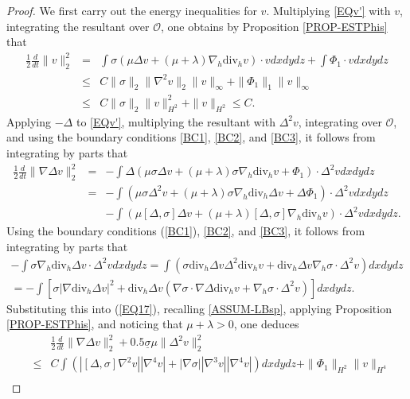 \documentclass[12pt,reqno]{amsart}
\numberwithin{equation}{section}
\begin{document}
\begin{proof}
We first carry out the energy inequalities for $v$. Multiplying \eqref{EQv'} with $v$, integrating the resultant over $\mathcal O$, one obtains by Proposition \ref{PROP-ESTPhis} that
\begin{eqnarray}
  \frac12\frac{d}{dt}\|v\|_2^2&=&\int\sigma(\mu\Delta v+(\mu+\lambda)\nabla_h\text{div}_hv)\cdot vdxdydz+\int\Phi_1\cdot vdxdydz \nonumber\\
  &\leq& C\|\sigma\|_2\|\nabla^2v\|_2\|v\|_\infty+\|\Phi_1\|_1\|v\|_\infty\nonumber\\
  &\leq& C\|\sigma\|_{2}\|v\|_{H^2}^2+\|v\|_{H^2}\leq C.\label{EQ16}
\end{eqnarray}
Applying $-\Delta$ to \eqref{EQv'}, multiplying the resultant with $\Delta^2v$, integrating over $\mathcal O$, and using the boundary
conditions \eqref{BC1}, \eqref{BC2}, and \eqref{BC3}, it follows from integrating by parts that
\begin{eqnarray}
  \frac12\frac{d}{dt}\|\nabla\Delta v\|_2^2
  &=&-\int\Delta(\mu\sigma\Delta v+(\mu+\lambda)\sigma\nabla_h\text{div}_hv+\Phi_1)\cdot\Delta^2vdxdydz\nonumber\\
  &=&-\int(\mu\sigma\Delta^2v+(\mu+\lambda)\sigma\nabla_h\text{div}_h\Delta v+\Delta\Phi_1)\cdot\Delta^2vdxdydz\nonumber\\
  &&-\int(\mu[\Delta,\sigma]\Delta v+(\mu+\lambda)[\Delta,\sigma]\nabla_h\text{div}_hv)\cdot\Delta^2v dxdydz. \label{EQ17}
\end{eqnarray}
Using the boundary conditions (\ref{BC1}), \eqref{BC2}, and \eqref{BC3}, it follows from integrating by parts that
\begin{eqnarray*}
  -\int\sigma\nabla_h\text{div}_h\Delta v\cdot\Delta^2vdxdydz
  =\int(\sigma\text{div}_h\Delta v\Delta^2\text{div}_hv+\text{div}_h\Delta v\nabla_h\sigma\cdot\Delta^2v)dxdydz\\
  =-\int[\sigma|\nabla\text{div}_h\Delta v|^2+\text{div}_h\Delta v(\nabla\sigma\cdot\nabla\Delta\text{div}_hv+\nabla_h\sigma\cdot\Delta^2v)]dxdydz.
\end{eqnarray*}
Substituting this into (\ref{EQ17}), recalling \eqref{ASSUM-LBsp}, applying Proposition \ref{PROP-ESTPhis}, and noticing that $\mu+\lambda>0$,
one deduces
\begin{eqnarray}
  &&\frac12\frac{d}{dt}\|\nabla\Delta v\|_2^2+0.5\underline\sigma \mu\|\Delta^2v\|_2^2\nonumber \\
  &\leq& C\int(|[\Delta,\sigma]\nabla^2v||\nabla^4v|+|\nabla\sigma||\nabla^3v||\nabla^4v|)dxdydz+ \|\Phi_1\|_{H^2}\|v\|_{H^4}\nonumber\\

\end{eqnarray}
\end{proof}
\end{document}
